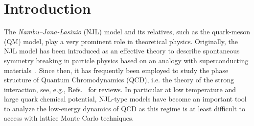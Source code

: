 \documentclass[prd,english,preprintnumbers,amsmath,amssymb,nofootinbib,twocolumn,superscriptaddress]{revtex4-1}
\begin{document}
\section{Introduction}
%
The {\it Nambu--Jona-Lasinio} (NJL) model and its relatives, such as the quark-meson (QM) model, 
play a very prominent role in theoretical physics. Originally, the NJL model has been
introduced as an effective theory to describe spontaneous symmetry breaking in particle physics based on an analogy with 
superconducting materials~\cite{Nambu:1961tp, *Nambu:1961fr}. Since then, it {has frequently been employed}
to study {the phase structure of Quantum Chromodynamics (QCD), i.e. the} theory of the strong interaction,
see, e.g., Refs.~\cite{Klevansky:1992qe,Buballa:2003qv,Fukushima:2011jc,Andersen:2014xxa} for reviews. In particular
at low temperature and large quark chemical potential, NJL-type models have {become an 
important tool to} analyze the low-energy dynamics
of QCD as this regime is at least difficult to access with lattice Monte Carlo techniques.
\end{document}
